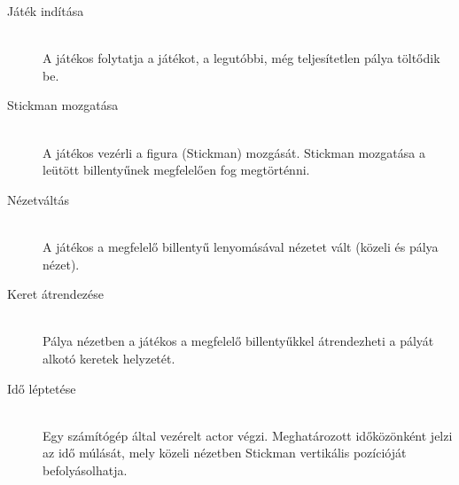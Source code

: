 		\begin{description}
		
		\item[Játék indítása] \hfill \\
			A játékos folytatja a játékot, a legutóbbi, még teljesítetlen pálya töltődik be.
		\item[Stickman mozgatása]\hfill \\
			A játékos vezérli a figura (Stickman) mozgását. Stickman mozgatása a leütött billentyűnek megfelelően fog megtörténni.
		\item[Nézetváltás]\hfill \\
			A játékos a megfelelő billentyű lenyomásával nézetet vált (közeli és pálya nézet).
		\item[Keret átrendezése]\hfill \\
			Pálya nézetben a játékos a megfelelő billentyűkkel átrendezheti a pályát alkotó keretek helyzetét.
		\item[Idő léptetése]\hfill \\
			Egy számítógép által vezérelt actor végzi. Meghatározott időközönként jelzi az idő múlását, mely közeli nézetben Stickman vertikális pozícióját befolyásolhatja.
		\end{description}

